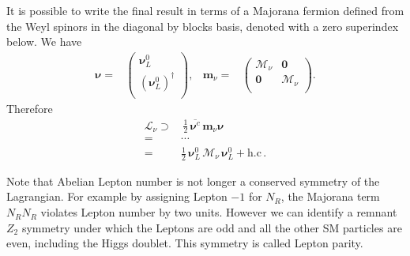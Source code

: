 It is possible to write the final result in terms of a Majorana fermion defined from the Weyl spinors in the diagonal by blocks basis, denoted with a zero superindex below. We have
\begin{align}
  \boldsymbol{\nu}=&
  \begin{pmatrix}
    \boldsymbol{\nu}_L^0\\
    \left( \boldsymbol{\nu}_L^0 \right)^{\dagger}\\
  \end{pmatrix},&       \boldsymbol{m}_{\nu}=& \begin{pmatrix}
                                      \boldsymbol{\mathcal{M}}_{\nu} & \boldsymbol{0} \\
                                      \boldsymbol{0} & \boldsymbol{\mathcal{M}}_{\nu}  \\
                                    \end{pmatrix}.
\end{align}
Therefore
\begin{align}
  \mathcal{L}_{\nu}\supset &\, \tfrac{1}{2}\,\overline{\boldsymbol{\nu}^c}\, \boldsymbol{m}_{\nu} \boldsymbol{\nu}   \nonumber\\
=& \cdots \nonumber\\
=&\tfrac{1}{2}\,\boldsymbol{\nu}_L^{0}\, \boldsymbol{\mathcal{M}}_{\nu}\,   \boldsymbol{\nu}_L^{0} +\text{h.c}\,.
\end{align}

Note that Abelian Lepton number is not longer a conserved symmetry of the Lagrangian. For example by assigning Lepton $-1$ for $N_R$, the Majorana term $N_R N_R$ violates Lepton number by two units. However we can identify a remnant $Z_{2}$ symmetry under which the Leptons are odd and all the other SM particles are even, including the Higgs doublet. This symmetry is called Lepton parity.


